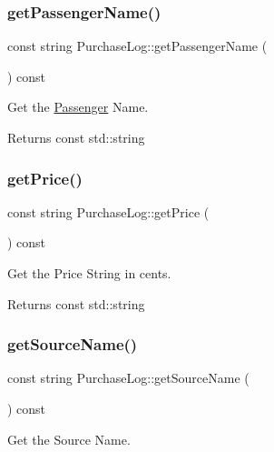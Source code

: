 \subsubsection{\texorpdfstring{get\+Passenger\+Name()}{getPassengerName()}}
{\footnotesize\ttfamily const string Purchase\+Log\+::get\+Passenger\+Name (\begin{DoxyParamCaption}{ }\end{DoxyParamCaption}) const}



Get the \mbox{\hyperlink{classPassenger}{Passenger}} Name. 

\begin{DoxyReturn}{Returns}
const std\+::string 
\end{DoxyReturn}
\mbox{\label{classPurchaseLog_a5fc1010f824f9ce26c309f9682d1b5ff}} 
\subsubsection{\texorpdfstring{get\+Price()}{getPrice()}}
{\footnotesize\ttfamily const string Purchase\+Log\+::get\+Price (\begin{DoxyParamCaption}{ }\end{DoxyParamCaption}) const}



Get the Price String in cents. 

\begin{DoxyReturn}{Returns}
const std\+::string 
\end{DoxyReturn}
\mbox{\label{classPurchaseLog_a5c994361a33f18ad521a2af034a6cd8f}} 
\subsubsection{\texorpdfstring{get\+Source\+Name()}{getSourceName()}}
{\footnotesize\ttfamily const string Purchase\+Log\+::get\+Source\+Name (\begin{DoxyParamCaption}{ }\end{DoxyParamCaption}) const}



Get the Source Name. 

